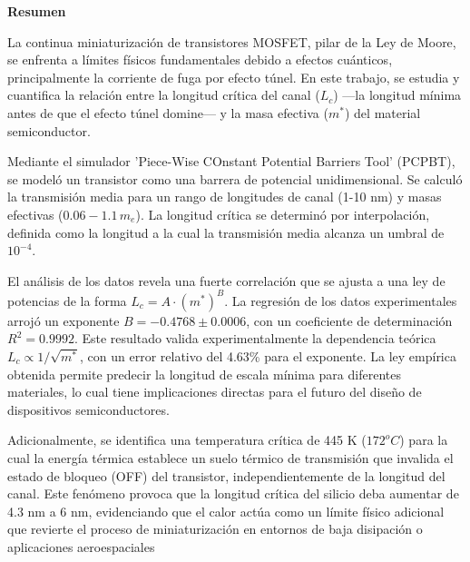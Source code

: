 \documentclass[11pt,a4paper,twoside,pdf]{article}
\numberwithin{equation}{section}
\begin{document}
\newpage
%
\begin{center}
{\bf Resumen}
\bigskip

\begin{minipage}{0.9\linewidth}
La continua miniaturización de transistores MOSFET, pilar de la Ley de Moore, se enfrenta a límites físicos fundamentales debido a efectos cuánticos, principalmente la corriente de fuga por efecto túnel. En este trabajo, se estudia y cuantifica la relación entre la longitud crítica del canal ($L_c$) —la longitud mínima antes de que el efecto túnel domine— y la masa efectiva ($m^*$) del material semiconductor.

Mediante el simulador 'Piece-Wise COnstant Potential Barriers Tool' (PCPBT), se modeló un transistor como una barrera de potencial unidimensional. Se calculó la transmisión media para un rango de longitudes de canal (1-10 nm) y masas efectivas ($0.06-1.1\,m_e$). La longitud crítica se determinó por interpolación, definida como la longitud a la cual la transmisión media alcanza un umbral de $10^{-4}$.

El análisis de los datos revela una fuerte correlación que se ajusta a una ley de potencias de la forma $L_c = A \cdot (m^*)^B$. La regresión de los datos experimentales arrojó un exponente $B = -0.4768 \pm 0.0006$, con un coeficiente de determinación $R^2 = 0.9992$. Este resultado valida experimentalmente la dependencia teórica $L_c \propto 1/\sqrt{m^*}$, con un error relativo del 4.63\% para el exponente. La ley empírica obtenida permite predecir la longitud de escala mínima para diferentes materiales, lo cual tiene implicaciones directas para el futuro del diseño de dispositivos semiconductores.

Adicionalmente, se identifica una temperatura crítica de 445 K ($172^o C$) para la cual la energía térmica establece un suelo térmico de transmisión que invalida el estado de bloqueo (OFF) del transistor, independientemente de la longitud del canal. Este fenómeno provoca que la longitud crítica del silicio deba aumentar de 4.3 nm a 6 nm, evidenciando que el calor actúa como un límite físico adicional que revierte el proceso de miniaturización en entornos de baja disipación o aplicaciones aeroespaciales

\end{minipage}

\vfill

\end{center}

\end{document}
